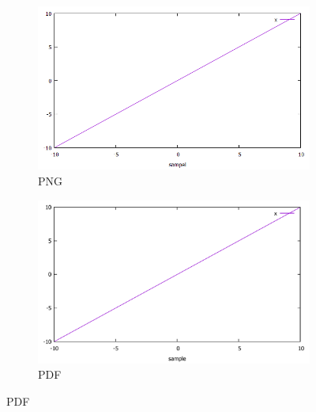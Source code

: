 \documentclass[11pt]{jsarticle}
\begin{document}
\begin{figure}[h]
    \centering
    \begin{subfigure}[b]{0.4\textwidth}
        \centering
        \includegraphics[width=\textwidth]{figure/sample.png}
        \caption{PNG}
        \label{fig:sample-png}
    \end{subfigure}
    \hfill
    \begin{subfigure}[b]{0.4\textwidth}
        \centering
        \includegraphics[width=\textwidth]{figure/sample.pdf}
        \caption{PDF}
        \label{fig:sample-pdf}
    \end{subfigure}

    \vspace{1em}


\end{figure}
\end{document}
